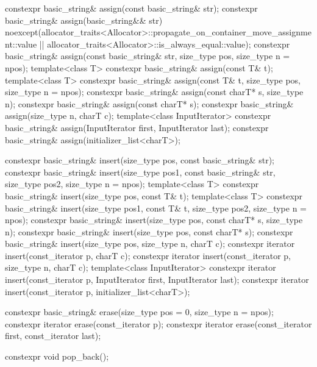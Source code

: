 \begin{codeblock}
{{    constexpr basic_string& assign(const basic_string& str);
    constexpr basic_string& assign(basic_string&& str)
      noexcept(allocator_traits<Allocator>::propagate_on_container_move_assignment::value ||
               allocator_traits<Allocator>::is_always_equal::value);
    constexpr basic_string& assign(const basic_string& str, size_type pos, size_type n = npos);
    template<class T>
      constexpr basic_string& assign(const T& t);
    template<class T>
      constexpr basic_string& assign(const T& t, size_type pos, size_type n = npos);
    constexpr basic_string& assign(const charT* s, size_type n);
    constexpr basic_string& assign(const charT* s);
    constexpr basic_string& assign(size_type n, charT c);
    template<class InputIterator>
      constexpr basic_string& assign(InputIterator first, InputIterator last);
    constexpr basic_string& assign(initializer_list<charT>);

    constexpr basic_string& insert(size_type pos, const basic_string& str);
    constexpr basic_string& insert(size_type pos1, const basic_string& str,
                                   size_type pos2, size_type n = npos);
    template<class T>
      constexpr basic_string& insert(size_type pos, const T& t);
    template<class T>
      constexpr basic_string& insert(size_type pos1, const T& t,
                                     size_type pos2, size_type n = npos);
    constexpr basic_string& insert(size_type pos, const charT* s, size_type n);
    constexpr basic_string& insert(size_type pos, const charT* s);
    constexpr basic_string& insert(size_type pos, size_type n, charT c);
    constexpr iterator insert(const_iterator p, charT c);
    constexpr iterator insert(const_iterator p, size_type n, charT c);
    template<class InputIterator>
      constexpr iterator insert(const_iterator p, InputIterator first, InputIterator last);
    constexpr iterator insert(const_iterator p, initializer_list<charT>);

    constexpr basic_string& erase(size_type pos = 0, size_type n = npos);
    constexpr iterator erase(const_iterator p);
    constexpr iterator erase(const_iterator first, const_iterator last);

    constexpr void pop_back();

}}
\end{codeblock}
